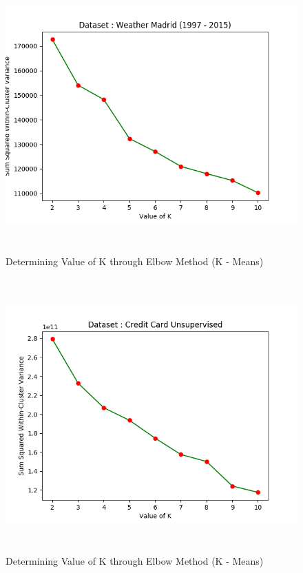 \documentclass[12pt]{article}
\begin{document}
\begin{figure}[H]
	\centering
	\includegraphics[width = \linewidth, height = 10.5cm]{Elbow_Weather.png}
	\caption{Determining Value of K through Elbow Method (K - Means)}
	\label{fig:elbow_weather}
\end{figure}

\begin{figure}[H]
	\centering
	\includegraphics[width = \linewidth, height = 10.5cm]{Elbow_CreditCard.png}
	\caption{Determining Value of K through Elbow Method (K - Means)}
	\label{fig:elbow_credit}
\end{figure}
\end{document}
